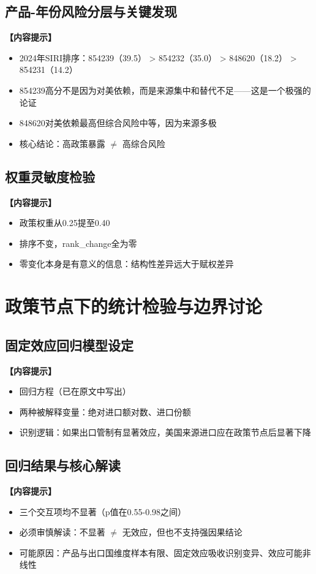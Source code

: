 \documentclass[UTF8,a4paper,12pt]{ctexart}
\begin{document}
\subsection{产品-年份风险分层与关键发现}
\noindent\textbf{【内容提示】}
\begin{itemize}[nosep]
    \item 2024年SIRI排序：854239（39.5） > 854232（35.0） > 848620（18.2） > 854231（14.2）
    \item 854239高分不是因为对美依赖，而是来源集中和替代不足——这是一个极强的论证
    \item 848620对美依赖最高但综合风险中等，因为来源多极
    \item 核心结论：高政策暴露 $\ne$ 高综合风险
\end{itemize}

\subsection{权重灵敏度检验}
\noindent\textbf{【内容提示】}
\begin{itemize}[nosep]
    \item 政策权重从0.25提至0.40
    \item 排序不变，rank\_change全为零
    \item 零变化本身是有意义的信息：结构性差异远大于赋权差异
\end{itemize}

\section{政策节点下的统计检验与边界讨论}

\subsection{固定效应回归模型设定}
\noindent\textbf{【内容提示】}
\begin{itemize}[nosep]
    \item 回归方程（已在原文中写出）
    \item 两种被解释变量：绝对进口额对数、进口份额
    \item 识别逻辑：如果出口管制有显著效应，美国来源进口应在政策节点后显著下降
\end{itemize}

\subsection{回归结果与核心解读}
\noindent\textbf{【内容提示】}
\begin{itemize}[nosep]
    \item 三个交互项均不显著（p值在0.55-0.98之间）
    \item 必须审慎解读：不显著 $\ne$ 无效应，但也不支持强因果结论
    \item 可能原因：产品与出口国维度样本有限、固定效应吸收识别变异、效应可能非线性
\end{itemize}
\end{document}
